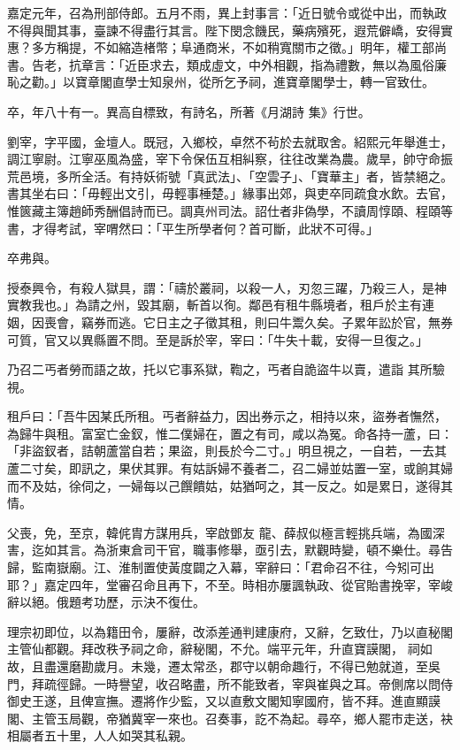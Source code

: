 \begin{pinyinscope}
 嘉定元年，召為刑部侍郎。五月不雨，異上封事言：「近日號令或從中出，而執政不得與聞其事，臺諫不得盡行其言。陛下閔念饑民，藥病殯死，遐荒僻嶠，安得實惠？多方稱提，不如縮造楮幣；阜通商米，不如稍寬關市之徵。」明年，權工部尚書。告老，抗章言：「近臣求去，類成虛文，中外相觀，指為禮數，無以為風俗廉恥之勸。」以寶章閣直學士知泉州，從所乞予祠，進寶章閣學士，轉一官致仕。



 卒，年八十有一。異高自標致，有詩名，所著《月湖詩
 集》行世。



 劉宰，字平國，金壇人。既冠，入鄉校，卓然不茍於去就取舍。紹熙元年舉進士，調江寧尉。江寧巫風為盛，宰下令保伍互相糾察，往往改業為農。歲旱，帥守命振荒邑境，多所全活。有持妖術號「真武法」、「空雲子」、「寶華主」者，皆禁絕之。書其坐右曰：「毋輕出文引，毋輕事棰楚。」緣事出郊，與吏卒同疏食水飲。去官，惟篋藏主簿趙師秀酬倡詩而已。調真州司法。詔仕者非偽學，不讀周惇頤、程頤等
 書，才得考試，宰喟然曰：「平生所學者何？首可斷，此狀不可得。」



 卒弗與。



 授泰興令，有殺人獄具，謂：「禱於叢祠，以殺一人，刃忽三躍，乃殺三人，是神實教我也。」為請之州，毀其廟，斬首以徇。鄰邑有租牛縣境者，租戶於主有連姻，因喪會，竊券而逃。它日主之子徵其租，則曰牛鬻久矣。子累年訟於官，無券可質，官又以異縣置不問。至是訴於宰，宰曰：「牛失十載，安得一旦復之。」



 乃召二丐者勞而語之故，托以它事系獄，鞫之，丐者自詭盜牛以賣，遣詣
 其所驗視。



 租戶曰：「吾牛因某氏所租。丐者辭益力，因出券示之，相持以來，盜券者憮然，為歸牛與租。富室亡金釵，惟二僕婦在，置之有司，咸以為冤。命各持一蘆，曰：「非盜釵者，詰朝蘆當自若；果盜，則長於今二寸。」明旦視之，一自若，一去其蘆二寸矣，即訊之，果伏其罪。有姑訴婦不養者二，召二婦並姑置一室，或餉其婦而不及姑，徐伺之，一婦每以己饌饋姑，姑猶呵之，其一反之。如是累日，遂得其情。



 父喪，免，至京，韓侂胄方謀用兵，宰啟鄧友
 龍、薛叔似極言輕挑兵端，為國深害，迄如其言。為浙東倉司干官，職事修舉，亟引去，默觀時變，頓不樂仕。尋告歸，監南嶽廟。江、淮制置使黃度闢之入幕，宰辭曰：「君命召不往，今矧可出耶？」嘉定四年，堂審召命且再下，不至。時相亦屢諷執政、從官貽書挽宰，宰峻辭以絕。俄題考功歷，示決不復仕。



 理宗初即位，以為籍田令，屢辭，改添差通判建康府，又辭，乞致仕，乃以直秘閣主管仙都觀。拜改秩予祠之命，辭秘閣，不允。端平元年，升直寶謨閣，
 祠如故，且盡還磨勘歲月。未幾，遷太常丞，郡守以朝命趣行，不得已勉就道，至吳門，拜疏徑歸。一時譽望，收召略盡，所不能致者，宰與崔與之耳。帝側席以問侍御史王遂，且俾宣撫。遷將作少監，又以直敷文閣知寧國府，皆不拜。進直顯謨閣、主管玉局觀，帝猶冀宰一來也。召奏事，訖不為起。尋卒，鄉人罷市走送，袂相屬者五十里，人人如哭其私親。




\end{pinyinscope}
